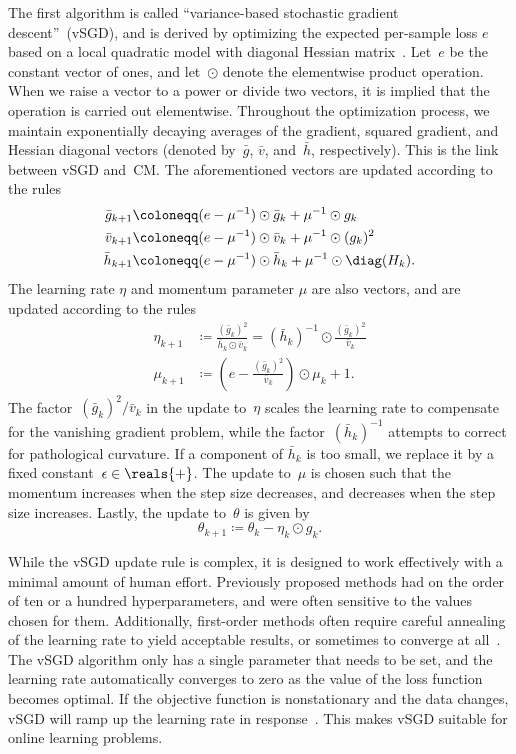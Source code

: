 \documentclass[11pt,a4paper]{article}
\numberwithin{equation}{section}
\begin{document}
The first algorithm is called ``variance-based stochastic gradient
descent''~(vSGD), and is derived by optimizing the expected per-sample loss $e$
based on a local quadratic model with diagonal Hessian
matrix~\citep{schaul-icml-13}. Let~$e$ be the constant vector of ones, and
let~$\odot$ denote the elementwise product operation. When we raise a vector to
a power or divide two vectors, it is implied that the operation is carried out
elementwise. Throughout the optimization process, we maintain exponentially
decaying averages of the gradient, squared gradient, and Hessian diagonal
vectors (denoted by~$\bar{g}$, $\bar{v}$, and~$\bar{h}$, respectively). This is
the link between vSGD and~CM. The aforementioned vectors are updated according
to the rules
\begin{align*}
	\bar{g}_{k + 1} &\coloneqq (e - \mu^{-1}) \odot \bar{g}_k + \mu^{-1} \odot g_k \\
	\bar{v}_{k + 1} &\coloneqq (e - \mu^{-1}) \odot \bar{v}_k + \mu^{-1} \odot (g_k)^2 \\
	\bar{h}_{k + 1} &\coloneqq (e - \mu^{-1}) \odot \bar{h}_k + \mu^{-1} \odot \diag(H_k).
\end{align*}
The learning rate $\eta$ and momentum parameter $\mu$ are also vectors, and are
updated according to the rules
\begin{align*}
	\eta_{k + 1} &\coloneqq \frac{(\bar{g}_k)^2}{\bar{h}_k \odot \bar{v}_k}
		= (\bar{h}_k)^{-1} \odot \frac{(\bar{g}_k)^2}{\bar{v}_k} \\
	\mu_{k + 1}  &\coloneqq \left( e - \frac{(\bar{g}_k)^2}{\bar{v}_k} \right)
		\odot \mu_k + 1.
\end{align*}
The factor~$(\bar{g}_k)^2 / \bar{v}_k$ in the update to~$\eta$ scales the
learning rate to compensate for the vanishing gradient problem, while the
factor~$(\bar{h}_k)^{-1}$ attempts to correct for pathological curvature. If
a component of $\bar{h}_k$ is too small, we replace it by a fixed
constant~$\epsilon \in \reals{+}$. The update to~$\mu$ is chosen such that the
momentum increases when the step size decreases, and decreases when the step
size increases. Lastly, the update to~$\theta$ is given by
\[
	\theta_{k + 1} \coloneqq \theta_k - \eta_k \odot g_k.
\]

While the vSGD update rule is complex, it is designed to work effectively with a
minimal amount of human effort. Previously proposed methods had on the order of
ten or a hundred hyperparameters, and were often sensitive to the values chosen
for them. Additionally, first-order methods often require careful annealing of
the learning rate to yield acceptable results, or sometimes to converge at
all~\citep{krizhevsky2012imagenet}. The vSGD algorithm only has a single
parameter that needs to be set, and the learning rate automatically converges to
zero as the value of the loss function becomes optimal. If the objective
function is nonstationary and the data changes, vSGD will ramp up the learning
rate in response~\citep{schaul-2013-icml}. This makes vSGD suitable for online
learning problems.
\end{document}

